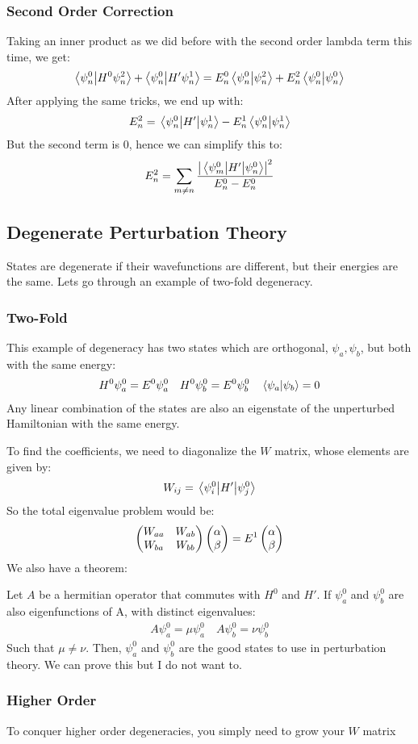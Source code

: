 \subsubsection{Second Order Correction}
Taking an inner product as we did before with the second order lambda term this time, we get:
\begin{align*}
  \ip{\psi_n^0}{H^0\psi_n^2}+\ip{\psi_n^0}{H'\psi_n^1}=
  E_n^0\ip{\psi_n^0}{\psi_n^2}+E_n^2\ip{\psi_n^0}{\psi_n^0}
\end{align*}
After applying the same tricks, we end up with:
\begin{align*}
  E_n^2=\mel{\psi_n^0}{H'}{\psi_n^1}-E_n^1\ip{\psi_n^0}{\psi_n^1}
\end{align*}
But the second term is 0, hence we can simplify this to:
\begin{align*}
  E_n^2=\sum_{m\neq n}\frac{\abs{\mel{\psi_m^0}{H'}{\psi_n^0}}^2}{E_n^0-E_n^0}
\end{align*}
\subsection{Degenerate Perturbation Theory}
States are degenerate if their wavefunctions are different, but their energies are the same. Lets go through an example of two-fold degeneracy.
\subsubsection{Two-Fold}
This example of degeneracy has two states which are orthogonal, $\psi_a,\psi_b$, but both with the same energy:
\begin{align*}
  H^0\psi_a^0=E^0\psi_a^0\quad H^0\psi_b^0=E^0\psi_b^0\quad\ip{\psi_a}{\psi_b}=0
\end{align*}
Any linear combination of the states are also an eigenstate of the unperturbed Hamiltonian with the same energy.

To find the coefficients, we need to diagonalize the $W$ matrix, whose elements are given by:
\begin{align*}
  W_{ij}=\mel{\psi_i^0}{H'}{\psi_j^0}
\end{align*}
So the total eigenvalue problem would be:
\begin{align*}
  \pmqty{W_{aa}&W_{ab}\\W_{ba}&W_{bb}}\pmqty{\alpha\\\beta}=E^1\pmqty{\alpha\\\beta}
\end{align*}
We also have a theorem:

Let $A$ be a hermitian operator that commutes with $H^0$ and $H'$. If $\psi_a^0$ and $\psi_b^0$ are also eigenfunctions of A, with distinct eigenvalues:
\begin{align*}
  A\psi_a^0=\mu\psi_a^0\quad A\psi_b^0=\nu\psi_b^0
\end{align*}
Such that $\mu\neq\nu$. Then, $\psi_a^0$ and $\psi_b^0$ are the good states to use in perturbation theory. We can prove this but I do not want to.
\subsubsection{Higher Order}
To conquer higher order degeneracies, you simply need to grow your $W$ matrix